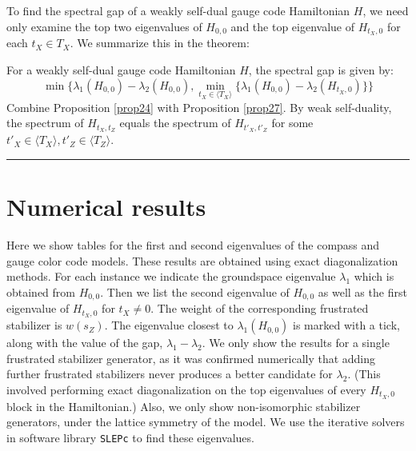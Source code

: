 \documentclass[11pt,oneside]{article}
\def\Span#1{\langle #1 \rangle}
\newcommand\dotheorem[1]{\vskip 5pt \noindent {\bf \underline{Theorem #1.}\ }}
\newcommand\doproof{\vskip 5pt \noindent{\bf \underline{Proof:}\ }}
\newcommand\tombstone{\rule{.36em}{2ex}\vskip 5pt}
\newcounter{ritem}
\newcommand{\ritem}[1]{\refstepcounter{ritem}\theritem\label{#1}}
\begin{document}
To find the spectral gap of a weakly self-dual gauge code Hamiltonian $H$,
we need only examine the top two eigenvalues of $H_{0,0}$ and 
the top eigenvalue of $H_{t_X,0}$ for each $t_X\in T_X.$ 
We summarize this in the theorem:

\dotheorem{\ritem{thm28}}
For a weakly self-dual gauge code Hamiltonian $H$,
the spectral gap is given by:
$$
    \min \bigl\{ \lambda_1(H_{0,0}) - \lambda_2(H_{0,0}),
        \min_{t_X\in\Span{T_X}} 
         \{ \lambda_1(H_{0,0}) - \lambda_2(H_{t_X,0}) \} \bigr\}
$$
\doproof
Combine Proposition \ref{prop24} with Proposition \ref{prop27}.
By weak self-duality, the spectrum of $H_{t_X,t_Z}$ equals
the spectrum of $H_{t'_X,t'_Z}$ for some 
$t'_X\in\Span{T_X}, t'_Z\in\Span{T_Z}.$
\tombstone


%



\section{Numerical results}

Here we show tables for the first and
second eigenvalues of the compass and gauge color code models.
These results are obtained using exact diagonalization methods.
For each instance we indicate the groundspace eigenvalue
$\lambda_1$ which is obtained from $H_{0,0}.$
Then we list the second eigenvalue of $H_{0,0}$ as
well as the first eigenvalue of $H_{t_X,0}$ for $t_X\ne 0.$
The weight of the corresponding frustrated stabilizer is $w(s_Z).$
The eigenvalue closest to $\lambda_1(H_{0,0})$ is marked
with a tick, along with the value of the gap, $\lambda_1-\lambda_2.$
We only show the results for a single frustrated
stabilizer generator,
as it was confirmed numerically that 
adding further frustrated stabilizers never 
produces a better candidate for $\lambda_2.$
(This involved performing exact diagonalization on 
the top eigenvalues of every $H_{t_X,0}$ block in the Hamiltonian.)
Also, we only show non-isomorphic stabilizer generators,
under the lattice symmetry of the model.
We use the iterative solvers in software library 
{\tt SLEPc} \cite{Hernandez2005} to find these eigenvalues.
\end{document}
